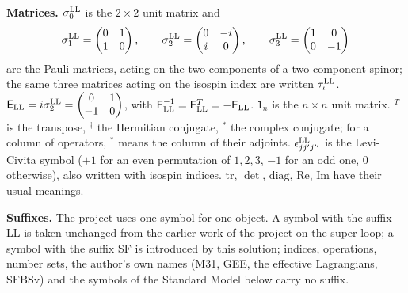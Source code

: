 \documentclass[
  10pt,
]{article}
\begin{document}
\textbf{Matrices.} \(\sigma^{\rm LL}_0\) is the \(2\times2\) unit matrix
and
\[\sigma^{\rm LL}_1=\begin{pmatrix}0&1\\1&0\end{pmatrix},\qquad\sigma^{\rm LL}_2=\begin{pmatrix}0&-i\\i&0\end{pmatrix},\qquad\sigma^{\rm LL}_3=\begin{pmatrix}1&0\\0&-1\end{pmatrix}\]
are the Pauli matrices, acting on the two components of a two-component
spinor; the same three matrices acting on the isospin index are written
\(\tau^{\rm LL}_\iota\).
\(\mathsf E_{\rm LL}=i\sigma^{\rm LL}_2=\begin{pmatrix}0&1\\-1&0\end{pmatrix}\),
with
\(\mathsf E_{\rm LL}^{-1}=\mathsf E_{\rm LL}^T=-\mathsf E_{\rm LL}\).
\(\mathsf 1_n\) is the \(n\times n\) unit matrix. \({}^T\) is the
transpose, \({}^\dagger\) the Hermitian conjugate, \({}^*\) the complex
conjugate; for a column of operators, \({}^*\) means the column of their
adjoints. \(\epsilon^{\rm LL}_{jj'j''}\) is the Levi-Civita symbol
(\(+1\) for an even permutation of \(1,2,3\), \(-1\) for an odd one, 0
otherwise), also written with isospin indices. \(\mathrm{tr}\),
\(\det\), \(\mathrm{diag}\), \(\mathrm{Re}\), \(\mathrm{Im}\) have their
usual meanings.

\textbf{Suffixes.} The project uses one symbol for one object. A symbol
with the suffix LL is taken unchanged from the earlier work of the
project on the super-loop; a symbol with the suffix SF is introduced by
this solution; indices, operations, number sets, the author's own names
(M31, GEE, the effective Lagrangians, \(\mathrm{SFBSv}\)) and the
symbols of the Standard Model below carry no suffix.
\end{document}
